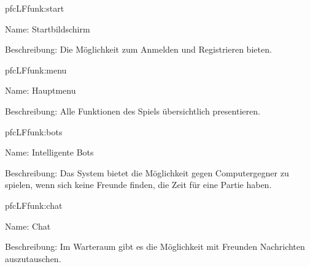 \begin{description}[leftmargin=5em, style=sameline]
	\begin{lhp}{pfc}{LF}{funk:start}
		\item [Name:] Startbildschirm
		\item [Beschreibung:] Die Möglichkeit zum Anmelden und Registrieren bieten.
	\end{lhp}

	\begin{lhp}{pfc}{LF}{funk:menu}
		\item [Name:] Hauptmenu
		\item [Beschreibung:] Alle Funktionen des Spiels übersichtlich presentieren.
	\end{lhp}

	\begin{lhp}{pfc}{LF}{funk:bots}
		\item [Name:] Intelligente Bots
		\item [Beschreibung:] Das System bietet die Möglichkeit gegen Computergegner zu spielen, wenn sich keine
		                      Freunde finden, die Zeit für eine Partie haben.
	\end{lhp}
	
	\begin{lhp}{pfc}{LF}{funk:chat}
		\item [Name:] Chat
		\item [Beschreibung:] Im Warteraum gibt es die Möglichkeit mit Freunden Nachrichten auszutauschen.
	\end{lhp}

\end{description}


